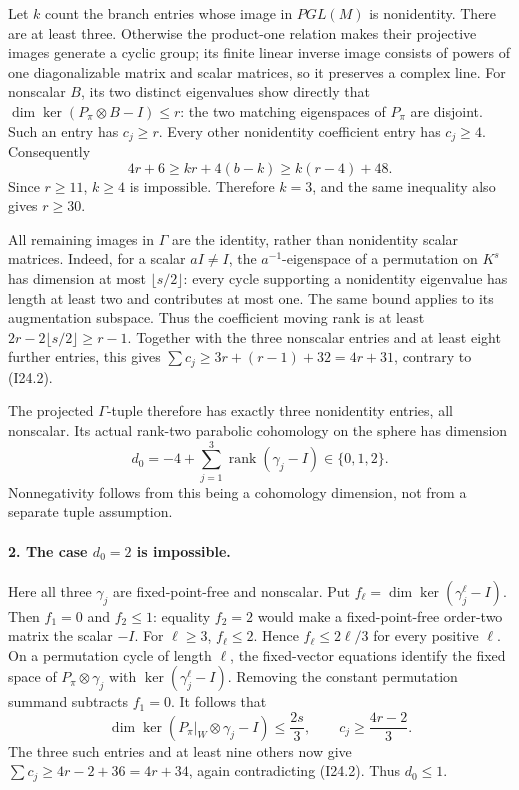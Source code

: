 Let \(k\) count the branch entries whose image in \(PGL(M)\) is
nonidentity. There are at least three. Otherwise the product-one
relation makes their projective images generate a cyclic group;
its finite linear inverse image consists of powers of one diagonalizable
matrix and scalar matrices, so it preserves a complex line.
For nonscalar \(B\), its two distinct eigenvalues show directly that
\(\dim\ker(P_\pi\otimes B-I)\le r\): the two matching eigenspaces
of \(P_\pi\) are disjoint. Such an entry has \(c_j\ge r\).
Every other nonidentity coefficient entry has \(c_j\ge4\).
Consequently
\[
        4r+6\ge kr+4(b-k)\ge k(r-4)+48.                    \tag{I24.3}
\]
Since \(r\ge11\), \(k\ge4\) is impossible. Therefore
\(k=3\), and the same inequality also gives \(r\ge30\).

All remaining images in \(\Gamma\) are the identity, rather than
nonidentity scalar matrices. Indeed, for a scalar \(aI\ne I\), the
\(a^{-1}\)-eigenspace of a permutation on \(K^s\) has dimension at
most \(\lfloor s/2\rfloor\): every cycle supporting a nonidentity
eigenvalue has length at least two and contributes at most one.
The same bound applies to its augmentation subspace. Thus the
coefficient moving rank is at least
\(2r-2\lfloor s/2\rfloor\ge r-1\). Together with the three
nonscalar entries and at least eight further entries, this gives
\(\sum c_j\ge3r+(r-1)+32=4r+31\), contrary to (I24.2).

The projected \(\Gamma\)-tuple therefore has exactly three
nonidentity entries, all nonscalar. Its actual rank-two parabolic
cohomology on the sphere has dimension
\[
 d_0=-4+\sum_{j=1}^3\operatorname{rank}(\gamma_j-I)
                         \in\{0,1,2\}.                    \tag{I24.4}
\]
Nonnegativity follows from this being a cohomology dimension, not
from a separate tuple assumption.

\paragraph{2. The case \(d_0=2\) is impossible.}
Here all three \(\gamma_j\) are fixed-point-free and nonscalar.
Put \(f_\ell=\dim\ker(\gamma_j^\ell-I)\). Then \(f_1=0\)
and \(f_2\le1\): equality \(f_2=2\) would make a fixed-point-free
order-two matrix the scalar \(-I\). For \(\ell\ge3\),
\(f_\ell\le2\). Hence \(f_\ell\le2\ell/3\) for every
positive \(\ell\). On a permutation cycle of length \(\ell\),
the fixed-vector equations identify the fixed space of
\(P_\pi\otimes\gamma_j\) with \(\ker(\gamma_j^\ell-I)\).
Removing the constant permutation summand subtracts \(f_1=0\).
It follows that
\[
 \dim\ker(P_\pi|_W\otimes\gamma_j-I)\le\frac{2s}{3},
 \qquad c_j\ge\frac{4r-2}{3}.                             \tag{I24.5}
\]
The three such entries and at least nine others now give
\(\sum c_j\ge4r-2+36=4r+34\), again contradicting (I24.2).
Thus \(d_0\le1\).

